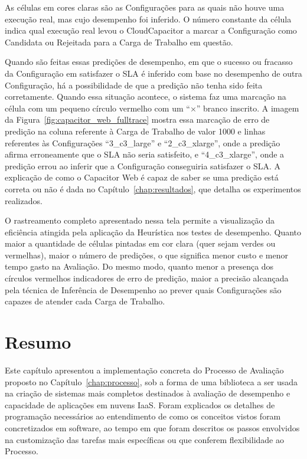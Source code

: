 As células em cores claras são as Configurações para as quais não houve uma execução
real, mas cujo desempenho foi inferido. O número constante da célula indica qual
execução real levou o CloudCapacitor a marcar a Configuração como Candidata ou 
Rejeitada para a Carga de Trabalho em questão.

Quando são feitas essas predições de desempenho, em que o sucesso ou fracasso
da Configuração em satisfazer o SLA é inferido com base no desempenho de outra
Configuração, há a possibilidade de que a predição não tenha sido feita corretamente.
Quando essa situação acontece, o sistema faz uma marcação na célula com um pequeno
círculo vermelho com um ``\boldmath$\times$'' branco inscrito. A imagem da 
Figura~\ref{fig:capacitor_web_fulltrace} mostra essa marcação de erro de predição
na coluna referente à Carga de Trabalho de valor 1000 e linhas referentes às
Configurações ``3\_c3\_large'' e ``2\_c3\_xlarge'', onde a predição afirma erroneamente
que o SLA não seria satisfeito, e ``4\_c3\_xlarge'', onde a predição errou ao inferir 
que a Configuração conseguiria satisfazer o SLA. A explicação de como o Capacitor Web 
é capaz de saber se uma predição está correta ou não é dada no Capítulo~\ref{chap:resultados},
que detalha os experimentos realizados.

O rastreamento completo apresentado nessa tela permite a visualização da eficiência atingida
pela aplicação da Heurística nos testes de desempenho. Quanto maior a quantidade
de células pintadas em cor clara (quer sejam verdes ou vermelhas), maior o número
de predições, o que significa menor custo e menor tempo gasto na Avaliação. Do mesmo 
modo, quanto menor a presença dos círculos vermelhos indicadores de erro de predição,
maior a precisão alcançada pela técnica de Inferência de Desempenho ao prever quais
Configurações são capazes de atender cada Carga de Trabalho.

\section{Resumo}
Este capítulo apresentou a implementação concreta do Processo de Avaliação proposto no
Capítulo~\ref{chap:processo}, sob a forma de uma biblioteca a ser usada na criação de sistemas
mais completos destinados à avaliação de desempenho e capacidade de aplicações em nuvens IaaS.
Foram explicados os detalhes de programação necessários ao entendimento de como os conceitos vistos
foram concretizados em software, ao tempo em que foram descritos os passos envolvidos na 
customização das tarefas mais específicas ou que conferem flexibilidade ao Processo.

